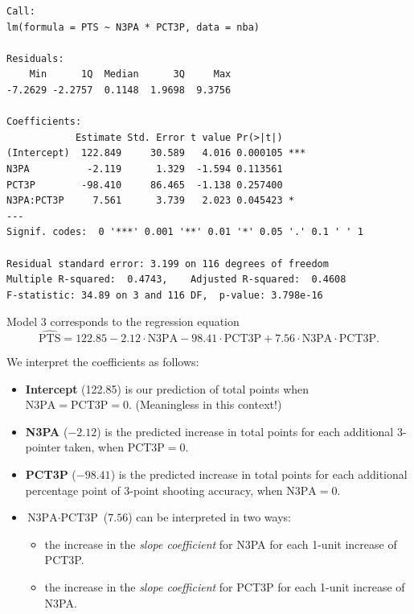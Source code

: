 \documentclass{beamer}\usepackage[]{graphicx}\usepackage[]{color}
\makeatletter
\newenvironment{kframe}{%
 \def\at@end@of@kframe{}%
 \ifinner\ifhmode%
  \def\at@end@of@kframe{\end{minipage}}%
  \begin{minipage}{\columnwidth}%
 \fi\fi%
 \def\FrameCommand##1{\hskip\@totalleftmargin \hskip-\fboxsep
 \colorbox{shadecolor}{##1}\hskip-\fboxsep
     \hskip-\linewidth \hskip-\@totalleftmargin \hskip\columnwidth}%
 \MakeFramed {\advance\hsize-\width
   \@totalleftmargin\z@ \linewidth\hsize
   \@setminipage}}%
 {\par\unskip\endMakeFramed%
 \at@end@of@kframe}
\newenvironment{knitrout}{}{} %
\makeatother
\begin{document}
\begin{darkframes}
\begin{frame}[fragile]
\begin{knitrout}
\begin{kframe}
\begin{verbatim}
Call:
lm(formula = PTS ~ N3PA * PCT3P, data = nba)

Residuals:
    Min      1Q  Median      3Q     Max 
-7.2629 -2.2757  0.1148  1.9698  9.3756 

Coefficients:
            Estimate Std. Error t value Pr(>|t|)    
(Intercept)  122.849     30.589   4.016 0.000105 ***
N3PA          -2.119      1.329  -1.594 0.113561    
PCT3P        -98.410     86.465  -1.138 0.257400    
N3PA:PCT3P     7.561      3.739   2.023 0.045423 *  
---
Signif. codes:  0 '***' 0.001 '**' 0.01 '*' 0.05 '.' 0.1 ' ' 1

Residual standard error: 3.199 on 116 degrees of freedom
Multiple R-squared:  0.4743,	Adjusted R-squared:  0.4608 
F-statistic: 34.89 on 3 and 116 DF,  p-value: 3.798e-16
\end{verbatim}
\end{kframe}
\end{knitrout}
    \end{frame}

    \begin{frame}[fragile]

      Model 3 corresponds to the regression equation
      \[
        \widehat{\text{PTS}} = 122.85 
          - 2.12 \cdot\text{N3PA}
          - 98.41 \cdot\text{PCT3P}
          + 7.56 \cdot\text{N3PA}\cdot\text{PCT3P}.
      \]

      \pause

      We interpret the coefficients as follows:
      \begin{itemize}[<+->]
        \item \textbf{Intercept} (122.85) is our prediction of total points when $\text{N3PA}=\text{PCT3P}=0$. (Meaningless in this context!)
        \item \textbf{N3PA} ($-2.12$) is the predicted increase in total points for each additional 3-pointer taken, when $\text{PCT3P}=0$.
        \item \textbf{PCT3P} ($-98.41$)  is the predicted increase in total points for each additional percentage point of 3-point shooting accuracy, when $\text{N3PA}=0$.
        \item \textbf{$\text{N3PA}\cdot\text{PCT3P}$} ($7.56$) can be interpreted in two ways:\pause
          \begin{itemize}[<+->]
            \item the increase in the \emph{slope coefficient} for N3PA for each 1-unit increase of PCT3P.
            \item the increase in the \emph{slope coefficient} for PCT3P for each 1-unit increase of N3PA.
          \end{itemize}
      \end{itemize}
      \lc
    \end{frame}


\end{darkframes}
\end{document}
